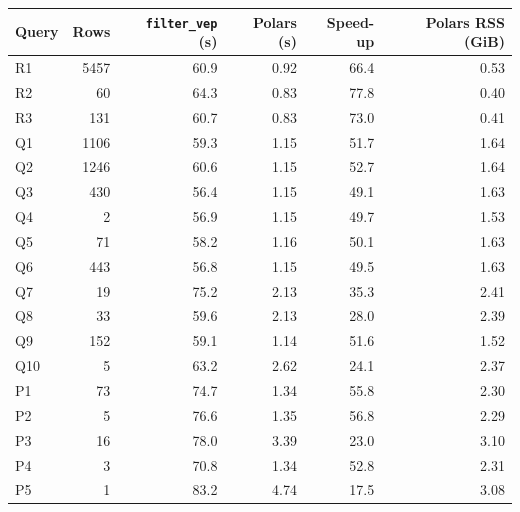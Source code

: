 \begin{tabular}{lrrrrr}
\toprule
Query & Rows & \texttt{filter\_vep} (s) & Polars (s) & Speed-up & Polars RSS (GiB) \\
\midrule
R1 & 5457 & 60.9 & 0.92 & 66.4 & 0.53 \\
R2 & 60 & 64.3 & 0.83 & 77.8 & 0.40 \\
R3 & 131 & 60.7 & 0.83 & 73.0 & 0.41 \\
Q1 & 1106 & 59.3 & 1.15 & 51.7 & 1.64 \\
Q2 & 1246 & 60.6 & 1.15 & 52.7 & 1.64 \\
Q3 & 430 & 56.4 & 1.15 & 49.1 & 1.63 \\
Q4 & 2 & 56.9 & 1.15 & 49.7 & 1.53 \\
Q5 & 71 & 58.2 & 1.16 & 50.1 & 1.63 \\
Q6 & 443 & 56.8 & 1.15 & 49.5 & 1.63 \\
Q7 & 19 & 75.2 & 2.13 & 35.3 & 2.41 \\
Q8 & 33 & 59.6 & 2.13 & 28.0 & 2.39 \\
Q9 & 152 & 59.1 & 1.14 & 51.6 & 1.52 \\
Q10 & 5 & 63.2 & 2.62 & 24.1 & 2.37 \\
P1 & 73 & 74.7 & 1.34 & 55.8 & 2.30 \\
P2 & 5 & 76.6 & 1.35 & 56.8 & 2.29 \\
P3 & 16 & 78.0 & 3.39 & 23.0 & 3.10 \\
P4 & 3 & 70.8 & 1.34 & 52.8 & 2.31 \\
P5 & 1 & 83.2 & 4.74 & 17.5 & 3.08 \\
\bottomrule
\end{tabular}
